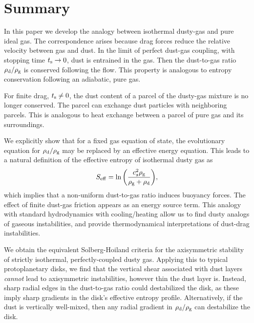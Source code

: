 

\section{Summary}\label{summary}
In this paper we develop the analogy between isothermal 
dusty-gas and pure ideal gas. The correspondence arises
because drag forces reduce the relative velocity between gas and
dust. In the limit of perfect dust-gas coupling, with stopping time $t_\mathrm{s} \to 0$,  
 dust is entrained in 
the gas. Then the dust-to-gas ratio $\rho_\mathrm{d}/\rho_\mathrm{g}$ is conserved
following the flow. This property is analogous to entropy conservation 
following an adiabatic, pure gas. 

For finite drag, $t_\mathrm{s}\neq 0$, the dust content of a 
parcel of the dusty-gas mixture is no longer conserved. The parcel 
can exchange dust particles with neighboring parcels. %
This is analogous to heat exchange between a parcel of pure gas and
its surroundings.    

We explicitly show that for a fixed gas equation of state, the  
evolutionary equation for $\rho_\mathrm{d}/\rho_\mathrm{g}$ may be replaced by an 
effective energy equation. This leads to a 
natural definition of the effective entropy of isothermal dusty gas as  
\begin{align*}
  S_\mathrm{eff}  = \ln{\left(\frac{c_s^2\rho_\mathrm{g}}{\rho_\mathrm{g}+\rho_\mathrm{d}}\right)},  
\end{align*}
which implies that a non-uniform dust-to-gas ratio induces buoyancy forces.  
The effect of finite dust-gas friction appears as an energy
source term.  This analogy with standard  
hydrodynamics with cooling/heating allow us to find dusty analogs of gaseous
instabilities, and provide thermodynamical interpretations of  
dust-drag instabilities. 


We obtain the equivalent Solberg-Hoiland criteria for the 
axisymmetric stability of strictly isothermal, perfectly-coupled dusty gas.  
Applying this to typical protoplanetary disks, we find that 
the vertical shear associated with dust 
 layers \emph{cannot} lead to axisymmetric  
  instabilities, however thin the dust layer is.    
Instead, sharp radial  edges in the dust-to-gas ratio could destabilized the
disk, as these imply sharp gradients in the disk's effective entropy
profile. Alternatively, if the dust is vertically well-mixed, then any
radial gradient in $\rho_\mathrm{d}/\rho_\mathrm{g}$ can destabilize the disk. 

